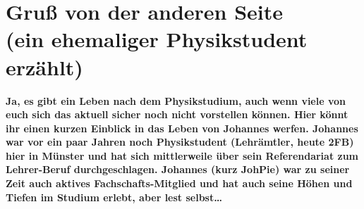 \section[Gruß von der anderen Seite (ein ehemaliger Physikstudent erzählt)]{Gruß von der anderen Seite\\(ein ehemaliger Physikstudent erzählt)}
\textbf{Ja, es gibt ein Leben nach dem Physikstudium, auch wenn viele von euch sich das aktuell sicher noch nicht vorstellen können.
Hier könnt ihr einen kurzen Einblick in das Leben von Johannes werfen.
Johannes war vor ein paar Jahren noch Physikstudent (Lehrämtler, heute 2FB) hier in Münster und hat sich mittlerweile über sein Referendariat zum Lehrer-Beruf durchgeschlagen.
Johannes (kurz JohPie) war zu seiner Zeit auch aktives Fachschafts-Mitglied und hat auch seine Höhen und Tiefen im Studium erlebt, aber lest selbst\dots}

